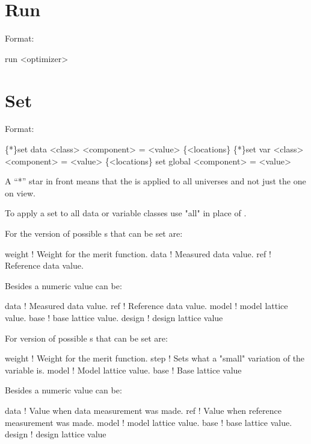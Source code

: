 \section{Run}
\label{s:run}

Format:
\begin{example}
  run <optimizer>
\end{example}

\vskip 0.2in

\section{Set}
\label{s:set}

Format:
\begin{example}
  \{*\}set data <class> <component> = <value> \{<locations\}
  \{*\}set var <class> <component> = <value> \{<locations\}
  set global <component> = <value>
\end{example}

\vskip 0.2in
A ``*'' star in front means that the  is applied
to all universes and not just the one on view.

To apply a set to all data or variable classes use "all"
in place of .

For the  version of  possible 
s that can be set are:
\begin{example}
  weight      ! Weight for the merit function.
  data        ! Measured data value.
  ref         ! Reference data value.
\end{example}
Besides a numeric value  can be:
\begin{example}
  data        ! Measured data value.
  ref         ! Reference data value.
  model       ! model lattice value.
  base        ! base lattice value.
  design      ! design lattice value
\end{example}

For  version of  possible 
s that can be set are:
\begin{example}
  weight     ! Weight for the merit function.
  step       ! Sets what a "small" variation of the variable is.
  model      ! Model lattice value.
  base       ! Base lattice value
\end{example}
Besides a numeric value  can be:
\begin{example}
  data        ! Value when data measurement was made.
  ref         ! Value when reference measurement was made.
  model       ! model lattice value.
  base        ! base lattice value.
  design      ! design lattice value
\end{example}

